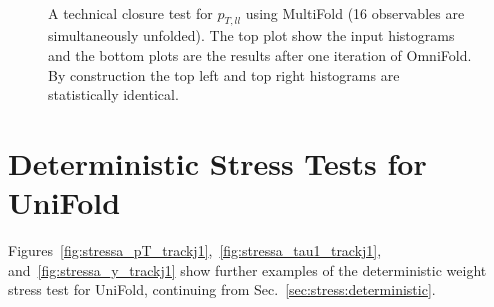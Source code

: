 \documentclass[NOTE, atlasdraft=true, texlive=2016, UKenglish]{\ATLASLATEXPATH atlasdoc}
\begin{document}
\begin{figure}[h!]
\centering
{}\\
\caption{A technical closure test for $p_{T,ll}$ using MultiFold (16 observables are simultaneously unfolded).  The top plot show the input histograms and the bottom plots are the results after one iteration of OmniFold.  By construction the top left and top right histograms are statistically identical.}
\label{fig:technicalclosureMulti:ptll}
\end{figure}

\clearpage

\section{Deterministic Stress Tests for UniFold}
\label{sec:stressunifolddet}

Figures~\ref{fig:stressa_pT_trackj1},~\ref{fig:stressa_tau1_trackj1}, and~\ref{fig:stressa_y_trackj1} show further examples of the deterministic weight stress test for UniFold, continuing from Sec.~\ref{sec:stress:deterministic}.
\end{document}
